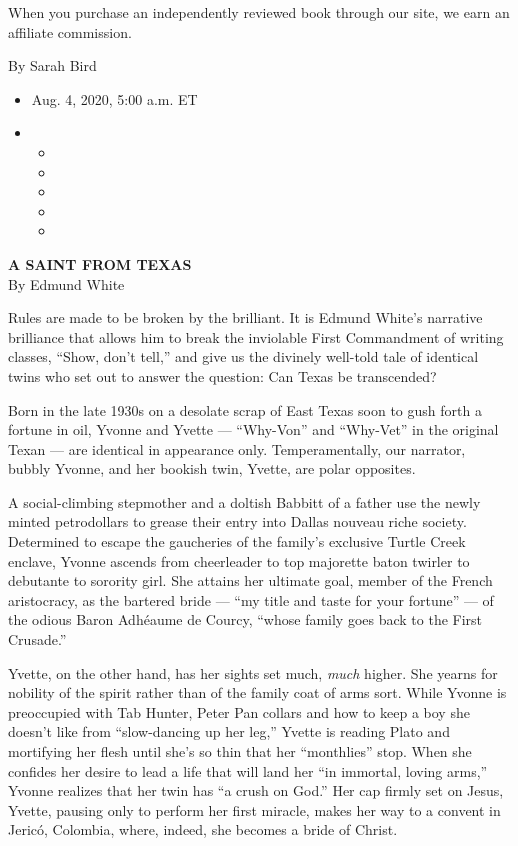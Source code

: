When you purchase an independently reviewed book through our site, we
earn an affiliate commission.

By Sarah Bird

\begin{itemize}
\item
  Aug. 4, 2020, 5:00 a.m. ET
\item
  \begin{itemize}
  \item
  \item
  \item
  \item
  \item
  \end{itemize}
\end{itemize}

\textbf{A SAINT FROM TEXAS}\\
By Edmund White

Rules are made to be broken by the brilliant. It is Edmund White's
narrative brilliance that allows him to break the inviolable First
Commandment of writing classes, ``Show, don't tell,'' and give us the
divinely well-told tale of identical twins who set out to answer the
question: Can Texas be transcended?

Born in the late 1930s on a desolate scrap of East Texas soon to gush
forth a fortune in oil, Yvonne and Yvette --- ``Why-Von'' and
``Why-Vet'' in the original Texan --- are identical in appearance only.
Temperamentally, our narrator, bubbly Yvonne, and her bookish twin,
Yvette, are polar opposites.

A social-climbing stepmother and a doltish Babbitt of a father use the
newly minted petrodollars to grease their entry into Dallas nouveau
riche society. Determined to escape the gaucheries of the family's
exclusive Turtle Creek enclave, Yvonne ascends from cheerleader to top
majorette baton twirler to debutante to sorority girl. She attains her
ultimate goal, member of the French aristocracy, as the bartered bride
--- ``my title and taste for your fortune'' --- of the odious Baron
Adhéaume de Courcy, ``whose family goes back to the First Crusade.''

Yvette, on the other hand, has her sights set much, \emph{much} higher.
She yearns for nobility of the spirit rather than of the family coat of
arms sort. While Yvonne is preoccupied with Tab Hunter, Peter Pan
collars and how to keep a boy she doesn't like from ``slow-dancing up
her leg,'' Yvette is reading Plato and mortifying her flesh until she's
so thin that her ``monthlies'' stop. When she confides her desire to
lead a life that will land her ``in immortal, loving arms,'' Yvonne
realizes that her twin has ``a crush on God.'' Her cap firmly set on
Jesus, Yvette, pausing only to perform her first miracle, makes her way
to a convent in Jericó, Colombia, where, indeed, she becomes a bride of
Christ.

